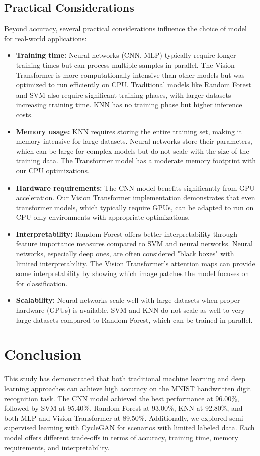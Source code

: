 \documentclass{article}
\begin{document}
\subsection{Practical Considerations}
Beyond accuracy, several practical considerations influence the choice of model for real-world applications:

\begin{itemize}
    \item \textbf{Training time:} Neural networks (CNN, MLP) typically require longer training times but can process multiple samples in parallel. The Vision Transformer is more computationally intensive than other models but was optimized to run efficiently on CPU. Traditional models like Random Forest and SVM also require significant training phases, with larger datasets increasing training time. KNN has no training phase but higher inference costs.

    \item \textbf{Memory usage:} KNN requires storing the entire training set, making it memory-intensive for large datasets. Neural networks store their parameters, which can be large for complex models but do not scale with the size of the training data. The Transformer model has a moderate memory footprint with our CPU optimizations.

    \item \textbf{Hardware requirements:} The CNN model benefits significantly from GPU acceleration. Our Vision Transformer implementation demonstrates that even transformer models, which typically require GPUs, can be adapted to run on CPU-only environments with appropriate optimizations.

    \item \textbf{Interpretability:} Random Forest offers better interpretability through feature importance measures compared to SVM and neural networks. Neural networks, especially deep ones, are often considered "black boxes" with limited interpretability. The Vision Transformer's attention maps can provide some interpretability by showing which image patches the model focuses on for classification.

    \item \textbf{Scalability:} Neural networks scale well with large datasets when proper hardware (GPUs) is available. SVM and KNN do not scale as well to very large datasets compared to Random Forest, which can be trained in parallel.
\end{itemize}

\section{Conclusion}
This study has demonstrated that both traditional machine learning and deep learning approaches can achieve high accuracy on the MNIST handwritten digit recognition task. The CNN model achieved the best performance at 96.00\%, followed by SVM at 95.40\%, Random Forest at 93.00\%, KNN at 92.80\%, and both MLP and Vision Transformer at 89.50\%. Additionally, we explored semi-supervised learning with CycleGAN for scenarios with limited labeled data. Each model offers different trade-offs in terms of accuracy, training time, memory requirements, and interpretability.
\end{document}

